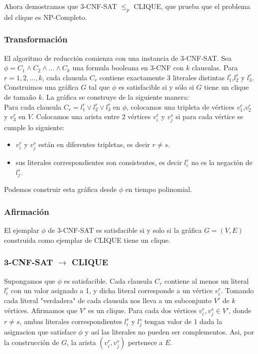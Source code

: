 \documentclass[a4paper]{article}
\begin{document}
Ahora demostramos que 3-CNF-SAT $\leq_p$ CLIQUE, que prueba que el problema del clique es NP-Completo.\\

\subsubsection{Transformación}

El algoritmo de reducción comienza con una instancia de 3-CNF-SAT. Sea $\phi = C_1\land C_2\land ... \land C_k$ una formula booleana en 3-CNF con $k$ clausulas. Para $r=1,2,...,k$, cada clausula $C_r$ contiene exactamente 3 literales distintas $l^r_1$,$l^r_2$ y $l^r_3$. Construimos una gráfica $G$ tal que $\phi$ es satisfacible si y sólo si $G$ tiene un clique de tamaño $k$. La gráfica se construye de la siguiente manera:\\

Para cada clausula $C_r= l^r_1\lor l^r_2 \lor l^r_3$ en $\phi$, colocamos una tripleta de vértices $v^r_1$,$v^r_2$ y $v^r_3$ en $V$. Colocamos una arista entre 2 vértices $v^r_i$ y $v^s_j$ si para cada vértice se cumple lo siguiente:\\
\begin{itemize}
    \item $v^r_i$ y $v^s_j$ están en diferentes tripletas, es decir $r \neq s$.
    \item sus literales correspondientes son consistentes, es decir $l^r_i$ no es la negación de $l^s_j$.
\end{itemize}

Podemos construir esta gráfica desde $\phi$ en tiempo polinomial.

\subsubsection{Afirmación}

El ejemplar $\phi$ de 3-CNF-SAT es satisfacible si y solo si la gráfica $G=(V,E)$ construida como ejemplar de CLIQUE tiene un clique.\\

\subsubsection{3-CNF-SAT $\to$ CLIQUE}

Supongamos que $\phi$ es satisfacible. Cada clausula $C_r$ contiene al menos un literal $l^r_i$ con un valor asignado a 1, y dicha literal corresponde a un vértice $v^r_i$. Tomando cada literal "verdadera" de cada clausula nos lleva a un subconjunto $V'$ de $k$ vértices. Afirmamos que $V'$ es un clique. Para cada dos vértices $v^r_i, v^s_j \in V'$, donde $r \neq s$, ambas literales correspondientes $l^r_i$ y $l^s_j$ tengan valor de 1 dada la asignacion que satisface $\phi$ y así las literales no pueden ser complementos. Asi, por la construcción de $G$, la arista $(v^r_i, v^s_j )$ pertenece a $E$.
\end{document}
